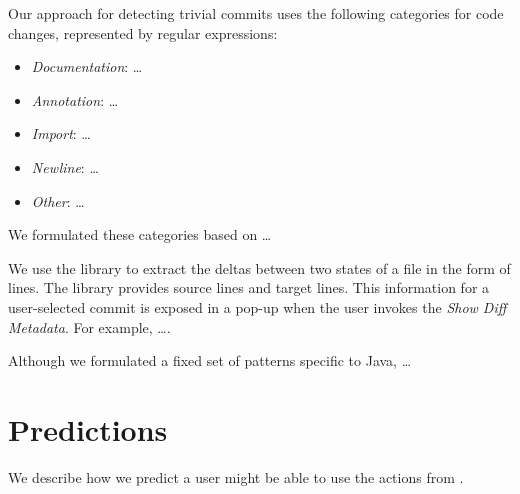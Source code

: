 Our approach for detecting trivial commits uses the following categories for code changes, represented by regular expressions: 

\begin{itemize}
    \item \textit{Documentation}: \dots
    \item \textit{Annotation}: \dots
    \item \textit{Import}: \dots
    \item \textit{Newline}: \dots
    \item \textit{Other}: \dots
\end{itemize}

We formulated these categories based on \dots {}

We use the  \cite{java-diff-utils} library to extract the deltas between two states of a file in the form of lines. 
The library provides source lines and target lines. 
This information for a user-selected commit is exposed in a pop-up when the user invokes the \textit{Show Diff Metadata}.
For example, \dots {}.

Although we formulated a fixed set of patterns specific to Java, \dots {}

\section{Predictions}
\label{sec:Predictions}

We describe how we predict a user might be able to use the actions from .

\endinput

Any text after an \endinput is ignored.
You could put scraps here or things in progress.